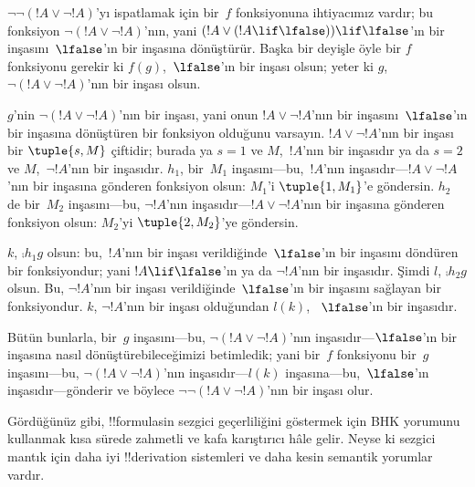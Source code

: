 \begin{ex}
$\lnot \lnot (!A \lor \lnot !A)$'yı ispatlamak için bir~$f$ fonksiyonuna
ihtiyacımız vardır; bu fonksiyon $\lnot(!A \lor \lnot !A)$'nın, yani $(!A
\lor (!A \lif \lfalse)) \lif \lfalse$'ın bir inşasını~$\lfalse$'ın bir
inşasına dönüştürür. Başka bir deyişle öyle bir $f$ fonksiyonu gerekir ki
$f(g)$,~$\lfalse$'ın bir inşası olsun; yeter ki $g$, $\lnot(!A \lor \lnot
!A)$'nın bir inşası olsun.

$g$'nin $\lnot(!A \lor \lnot !A)$'nın bir inşası, yani onun $!A \lor
\lnot !A$'nın bir inşasını~$\lfalse$'ın bir inşasına dönüştüren bir fonksiyon
olduğunu varsayın. $!A \lor \lnot !A$'nın bir inşası bir $\tuple{s, M}$
çiftidir; burada ya $s = 1$ ve $M$,~$!A$'nın bir inşasıdır ya da $s = 2$ ve
$M$,~$\lnot !A$'nın bir inşasıdır. $h_1$, bir~$M_1$ inşasını---bu,~$!A$'nın
inşasıdır---$!A \lor \lnot !A$'nın bir inşasına gönderen fonksiyon olsun:
$M_1$'i $\tuple{1, M_1}$'e göndersin. $h_2$ de bir~$M_2$ inşasını---bu,
$\lnot !A$'nın inşasıdır---$!A \lor \lnot !A$'nın bir inşasına gönderen
fonksiyon olsun: $M_2$'yi $\tuple{2, M_2}$'ye göndersin.

$k$, $\comp{h_1}{g}$ olsun: bu,~$!A$'nın bir inşası verildiğinde~$\lfalse$'ın
bir inşasını döndüren bir fonksiyondur; yani $!A \lif \lfalse$'ın ya da
$\lnot !A$'nın bir inşasıdır. Şimdi $l$, $\comp{h_2}{g}$ olsun. Bu,
$\lnot !A$'nın bir inşası verildiğinde~$\lfalse$'ın bir inşasını sağlayan bir
fonksiyondur. $k$, $\lnot !A$'nın bir inşası olduğundan $l(k)$,
~$\lfalse$'ın bir inşasıdır.

Bütün bunlarla, bir~$g$ inşasını---bu, $\lnot(!A \lor \lnot !A)$'nın
inşasıdır---$\lfalse$'ın bir inşasına nasıl dönüştürebileceğimizi betimledik;
yani bir~$f$ fonksiyonu bir~$g$ inşasını---bu, $\lnot(!A \lor \lnot !A)$'nın
inşasıdır---$l(k)$ inşasına---bu,~$\lfalse$'ın inşasıdır---gönderir ve böylece
$\lnot\lnot(!A \lor \lnot !A)$'nın bir inşası olur.
\end{ex}

Gördüğünüz gibi, !!{formula}s{}in sezgici geçerliliğini göstermek için BHK
yorumunu kullanmak kısa sürede zahmetli ve kafa karıştırıcı hâle gelir. Neyse
ki sezgici mantık için daha iyi !!{derivation} sistemleri ve daha kesin
semantik yorumlar vardır.
